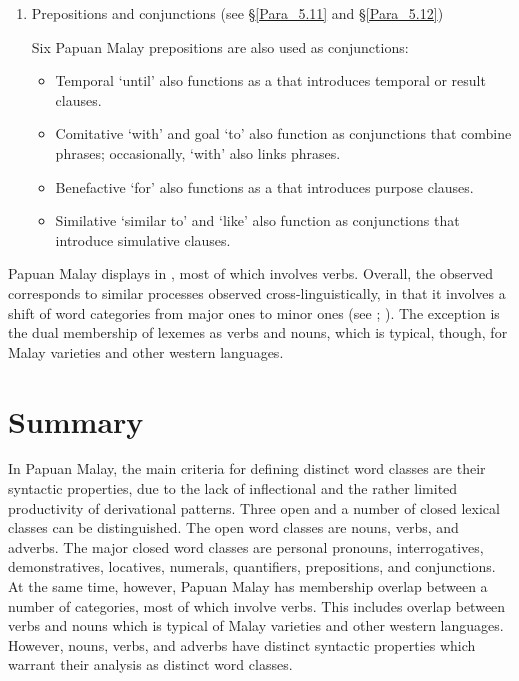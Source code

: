 \begin{enumerate}
\item 
Prepositions and conjunctions (see §\ref{Para_5.11} and §\ref{Para_5.12})


Six Papuan Malay prepositions are also used as conjunctions:

\begin{itemize}
\item 
Temporal  ‘until’ also functions as a  that introduces temporal or result clauses.
\item 
Comitative  ‘with’ and goal   ‘to’ also function as conjunctions that combine  phrases; occasionally,  ‘with’ also links  phrases.
\item 
Benefactive  ‘for’ also functions as a  that introduces purpose clauses.
\end{itemize}
\begin{itemize}
\item 
Similative  ‘similar to’ and  ‘like’ also function as conjunctions that introduce simulative clauses.

\end{itemize}
\end{enumerate}
Papuan Malay displays  in , most of which involves verbs. Overall, the observed  corresponds to similar processes observed cross-linguistically, in that it involves a shift of word categories from major ones to minor ones (see \citealt[4]{Heine.2002}; \citealt[133]{Wischer.2006}). The exception is the dual membership of lexemes as verbs and nouns, which is typical, though, for Malay varieties and other western  languages.


\section{Summary}\label{Para_5.15}

In Papuan Malay, the main criteria for defining distinct word classes are their syntactic properties, due to the lack of inflectional  and the rather limited productivity of derivational patterns. Three open and a number of closed lexical classes can be distinguished. The open word classes are nouns, verbs, and adverbs. The major closed word classes are personal pronouns, interrogatives, demonstratives, locatives, numerals, quantifiers, prepositions, and conjunctions. At the same time, however, Papuan Malay has membership overlap between a number of categories, most of which involve verbs. This includes overlap between verbs and nouns which is typical of Malay varieties and other western  languages. However, nouns, verbs, and adverbs have distinct syntactic properties which warrant their analysis as distinct word classes.



